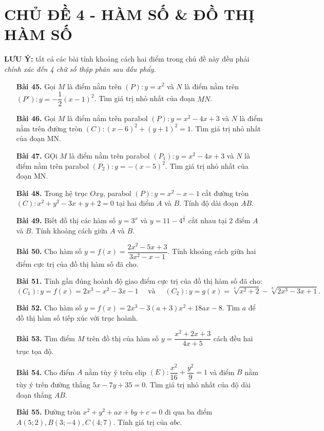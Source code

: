 \documentclass[12pt,a4paper]{article}
\begin{document}
\section*{CHỦ ĐỀ 4 - HÀM SỐ \& ĐỒ THỊ HÀM SỐ}
\textbf{LƯU Ý:} tất cả các bài tính khoảng cách hai điểm trong chủ đề này đều phải \textit{chính xác đến 4 chữ số thập phân sau dấu phẩy}.
\begin{enumerate}
\item[\textbf{Bài 45.}] Gọi $M$ là điểm nằm trên $(P):y=x^2$ và $N$ là điểm nằm trên $(P'):y=-\dfrac{1}{2}(x-1)^2$. Tìm giá trị nhỏ nhất của đoạn $MN$.
\item[\textbf{Bài 46.}] Gọi $M$ là điểm nẳm trên parabol $(P):y=x^2-4x+3$ và $N$ là điểm nằm trên đường tròn $(C):(x-6)^2 + (y+1)^2 =1$. Tìm giá trị nhỏ nhất của đoạn MN.
\item[\textbf{Bài 47.}] GỌi $M$ là điểm nằm trên parabol $(P_1):y=x^2-4x+3$ và $N$ là điểm nằm trên parabol $(P_2):y=-(x-5)^2$. Tìm giá trị nhỏ nhất của đoạn MN. 
\item[\textbf{Bài 48.}] Trong hệ trục $Oxy$, parabol $(P):y = x^2 - x - 1$ cắt đường tròn $(C):x^2 + y^2 - 3x + y + 2 = 0$ tại hai điểm $A$ và $B$. Tính độ dài đoạn $AB$.
\item[\textbf{Bài 49.}] Biết đồ thị các hàm số $y = 3^x$ và $y = 11 - 4^{\frac{1}{x}}$ cắt nhau tại 2 điểm $A$ và $B$. Tính khoảng cách giữa $A$ và $B$.
\item[\textbf{Bài 50.}] Cho hàm số $y=f(x)=\dfrac{2x^2 - 5x + 3}{3x^2 - x - 1}$. Tính khoảng cách giữa hai điểm cực trị của đồ thị hàm số đã cho.
\item[\textbf{Bài 51.}] Tính gần đúng hoành độ giao điểm cực trị của đồ thị hàm số đã cho:
\begin{equation*}
(C_1): y = f(x) = 2x^3 - x^2 - 3x -1 \quad \text{ và } \quad (C_2): y = g(x) = \sqrt[3]{x^2 + 2} - \sqrt[3]{2x^3 - 3x + 1}.
\end{equation*}
\item[\textbf{Bài 52.}] Cho hàm số $y=f(x)=2x^3-3(a+3)x^2+18ax-8$. Tìm $a$ để đồ thị hàm số tiếp xúc với trục hoành. 
\item[\textbf{Bài 53.}] Tìm điểm $M$ trên đồ thị của hàm số $y = \dfrac{x^2 + 2x + 3}{4x + 5}$ cách đều hai trục tọa độ.
\item[\textbf{Bài 54.}] Cho điểm $A$ nằm tùy ý trên elip $(E): \dfrac{x^2}{16} + \dfrac{y^2}{9} = 1$ và điểm $B$ nằm tùy ý trên đường thẳng $5x-7y+35=0.$ Tìm giá trị nhỏ nhất của độ dài đoạn thẳng $AB$.
\item[\textbf{Bài 55.}] Đường tròn $x^2 + y^2 + ax + by + c = 0$ đi qua ba điểm $A(5;2),B(3;-4),C(4;7)$. Tính giá trị của $abc$.

\end{enumerate}
\end{document}
